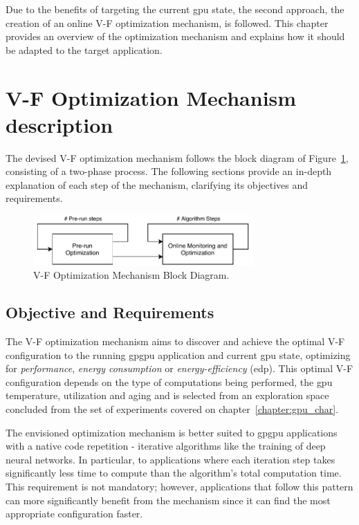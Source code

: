 Due to the benefits of targeting the current \acrshort{gpu} state, the second approach, the creation of an online V-F optimization mechanism, is followed. This chapter provides an overview of the optimization mechanism and explains how it should be adapted to the target application.


\section{V-F Optimization Mechanism description}
\label{section:opt}

The devised V-F optimization mechanism follows the block diagram of Figure~\ref{fig:opt_mech}, consisting of a two-phase process. The following sections provide an in-depth explanation of each step of the mechanism, clarifying its objectives and requirements.

\begin{figure}[htb]
  \centering
  \includegraphics[width=0.75\textwidth]{Figures/Optimization/full_mech_2.pdf}
  \caption{V-F Optimization Mechanism Block Diagram.}
  \label{fig:opt_mech}
\end{figure}

\subsection{Objective and Requirements}

The V-F optimization mechanism aims to discover and achieve the optimal V-F configuration to the running \acrshort{gpgpu} application and current \acrshort{gpu} state, optimizing for \textit{performance}, \textit{energy consumption} or \textit{energy-efficiency} (\acrshort{edp}). This optimal V-F configuration depends on the type of computations being performed, the \acrshort{gpu} temperature, utilization and aging and is selected from an exploration space concluded from the set of experiments covered on chapter~\ref{chapter:gpu_char}. 

The envisioned optimization mechanism is better suited to \acrshort{gpgpu} applications with a native code repetition - iterative algorithms like the training of deep neural networks. In particular, to applications where each iteration step takes significantly less time to compute than the algorithm's total computation time. This requirement is not mandatory; however, applications that follow this pattern can more significantly benefit from the mechanism since it can find the most appropriate configuration faster.

